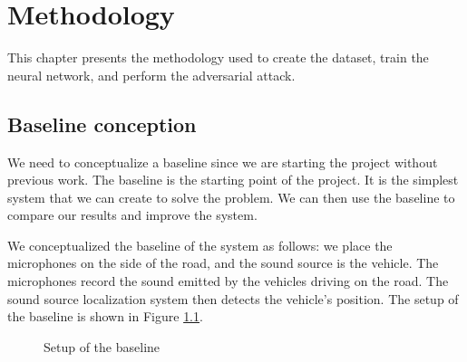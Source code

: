 
\chapter{Methodology}
\label{ch:methodology}

This chapter presents the methodology used to create the dataset, train the neural network, and perform the adversarial attack. 

\section{Baseline conception}

We need to conceptualize a baseline since we are starting the project without previous work. The baseline is the starting point of the project. It is the simplest system that we can create to solve the problem. We can then use the baseline to compare our results and improve the system.

We conceptualized the baseline of the system as follows: we place the microphones on the side of the road, and the sound source is the vehicle. The microphones record the sound emitted by the vehicles driving on the road. The sound source localization system then detects the vehicle's position. The setup of the baseline is shown in Figure \ref{fig:baseline_setup}.

\begin{figure}[H]
    \centering
    \qquad
    \caption{Setup of the baseline}%
    \label{fig:baseline_setup}%
\end{figure}

